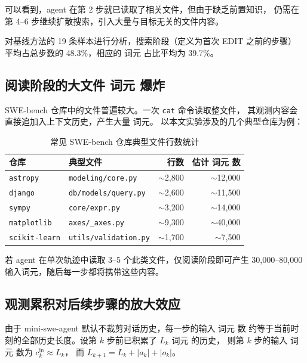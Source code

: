 可以看到，agent 在第 2 步就已读取了相关文件，但由于缺乏前置知识，
仍需在第 4--6 步继续扩散搜索，引入大量与目标无关的文件内容。

对基线方法的 19 条样本进行分析，搜索阶段（定义为首次 EDIT 之前的步骤）
平均占总步数的 48.3\%，相应的 词元 占比平均为 39.7\%。

\subsection{阅读阶段的大文件 词元 爆炸}
\label{subsec:read-cost}

SWE-bench 仓库中的文件普遍较大。一次 \texttt{cat} 命令读取整文件，
其观测内容会直接追加入上下文历史，产生大量 词元。
以本文实验涉及的几个典型仓库为例：

\begin{table}[htbp]
  \centering
  \caption{常见 SWE-bench 仓库典型文件行数统计}
  \label{tab:file-sizes}
  \begin{tabular}{llrr}
    \toprule
    仓库 & 典型文件 & 行数 & 估计 词元 数 \\
    \midrule
    \texttt{astropy} & \texttt{modeling/core.py} & $\sim$2,800 & $\sim$12,000 \\
    \texttt{django} & \texttt{db/models/query.py} & $\sim$2,600 & $\sim$11,500 \\
    \texttt{sympy} & \texttt{core/expr.py} & $\sim$3,200 & $\sim$14,000 \\
    \texttt{matplotlib} & \texttt{axes/\_axes.py} & $\sim$9,300 & $\sim$40,000 \\
    \texttt{scikit-learn} & \texttt{utils/validation.py} & $\sim$1,700 & $\sim$7,500 \\
    \bottomrule
  \end{tabular}
\end{table}

若 agent 在单次轨迹中读取 3--5 个此类文件，仅阅读阶段即可产生
30,000--80,000 输入词元，随后每一步都将携带这些内容。

\subsection{观测累积对后续步骤的放大效应}
\label{subsec:observation-amplification}

由于 mini-swe-agent 默认不裁剪对话历史，每一步的输入 词元 数
约等于当前时刻的全部历史长度。设第 $k$ 步前已积累了 $L_k$ 词元 的历史，
则第 $k$ 步的输入 词元 数为 $c_k^{\text{in}} \approx L_k$，
而 $L_{k+1} = L_k + |a_k| + |o_k|$。


